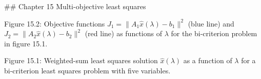 

## Chapter 15 Multi-objective least squares

Figure 15.2: Objective functions \(J_{1}=\|A_{1}\hat{x}(\lambda)-b_{1}\|^{2}\) (blue line) and \(J_{2}=\|A_{2}\hat{x}(\lambda)-b_{2}\|^{2}\) (red line) as functions of \(\lambda\) for the bi-criterion problem in figure 15.1.

Figure 15.1: Weighted-sum least squares solution \(\hat{x}(\lambda)\) as a function of \(\lambda\) for a bi-criterion least squares problem with five variables.

